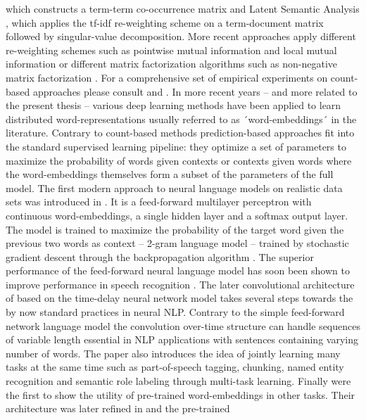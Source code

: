 which constructs a term-term co-occurrence matrix and Latent Semantic Analysis \cite{dumais2004latent},
which applies the tf-idf re-weighting scheme on a term-document matrix followed by singular-value decomposition.
More recent approaches apply different re-weighting schemes such as pointwise mutual information and local mutual
information \cite{evert2005statistics} or different matrix factorization algorithms such as non-negative
matrix factorization \cite{baroni2014don}. For a comprehensive set of empirical experiments on count-based
approaches please consult \cite{bullinaria2007extracting} and \cite{bullinaria2012extracting}.
In more recent years -- and more related to the present thesis --
various deep learning methods have been applied to learn distributed word-representations usually referred to
as ´word-embeddings´ in the literature. Contrary to count-based methods prediction-based approaches fit into the
standard supervised learning pipeline: they optimize a set of parameters to maximize the probability of words
given contexts or contexts given words where the word-embeddings themselves form a subset of the parameters
of the full model. The first modern approach to neural language models on realistic data sets was introduced
in \cite{bengio2003neural}. It is a feed-forward multilayer perceptron with continuous word-embeddings,
a single hidden layer and a softmax output layer. The model is trained to maximize the probability of
the target word given the previous two words as context -- 2-gram language model -- trained by stochastic
gradient descent \cite{cauchy1847methode} through the backpropagation  algorithm \cite{rumelhart1985learning}.
The superior performance of the feed-forward neural language model has soon been shown to
improve performance in speech recognition \cite{schwenk2005training}.
The later convolutional architecture of  \cite{collobert2008unified} based on the time-delay neural network
model \cite{waibel1990phoneme} takes several steps towards the by now standard practices in neural NLP.
Contrary to the simple feed-forward network language model the convolution over-time structure can handle
sequences of variable length essential in NLP applications with sentences containing varying number of words.
The paper also introduces the idea of jointly learning many tasks at the same time such as part-of-speech
tagging, chunking, named entity recognition and semantic role labeling through multi-task learning.
Finally \cite{collobert2008unified} were the first to show the utility of pre-trained word-embeddings
in other tasks. Their architecture was later refined in \cite{collobert2011natural} and the pre-trained
